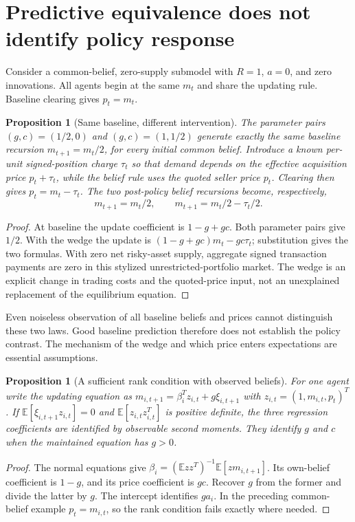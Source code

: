 \documentclass[11pt,a4paper]{article}
\newtheorem{proposition}[theorem]{Proposition}
\theoremstyle{definition}
\theoremstyle{remark}
\newcommand{\E}{\mathbb{E}}
\begin{document}
\section{Predictive equivalence does not identify policy response}
Consider a common-belief, zero-supply submodel with $R=1$, $a=0$, and zero innovations. All agents begin at the same $m_t$ and share the updating rule. Baseline clearing gives $p_t=m_t$.
\begin{proposition}[Same baseline, different intervention]
The parameter pairs $(g,c)=(1/2,0)$ and $(g,c)=(1,1/2)$ generate exactly the same baseline recursion $m_{t+1}=m_t/2$, for every initial common belief. Introduce a known per-unit signed-position charge $\tau_t$ so that demand depends on the effective acquisition price $p_t+\tau_t$, while the belief rule uses the quoted seller price $p_t$. Clearing then gives $p_t=m_t-\tau_t$. The two post-policy belief recursions become, respectively,
\[
 m_{t+1}=m_t/2,\qquad
 m_{t+1}=m_t/2-\tau_t/2.
\]
\end{proposition}
\begin{proof}
At baseline the update coefficient is $1-g+gc$. Both parameter pairs give $1/2$. With the wedge the update is
$(1-g+gc)m_t-gc\tau_t$; substitution gives the two formulas. With zero net risky-asset supply, aggregate signed transaction payments are zero in this stylized unrestricted-portfolio market. The wedge is an explicit change in trading costs and the quoted-price input, not an unexplained replacement of the equilibrium equation.
\end{proof}
Even noiseless observation of all baseline beliefs and prices cannot distinguish these two laws. Good baseline prediction therefore does not establish the policy contrast. The mechanism of the wedge and which price enters expectations are essential assumptions.
\begin{proposition}[A sufficient rank condition with observed beliefs]
For one agent write the updating equation as $m_{i,t+1}=\beta_i^T z_{i,t}+g\xi_{i,t+1}$ with $z_{i,t}=(1,m_{i,t},p_t)^T$. If $\E[\xi_{i,t+1}z_{i,t}]=0$ and $\E[z_{i,t}z_{i,t}^T]$ is positive definite, the three regression coefficients are identified by observable second moments. They identify $g$ and $c$ when the maintained equation has $g>0$.
\end{proposition}
\begin{proof}
The normal equations give
$\beta_i=(\E zz^T)^{-1}\E[zm_{i,t+1}]$.
Its own-belief coefficient is $1-g$, and its price coefficient is $gc$. Recover $g$ from the former and divide the latter by $g$. The intercept identifies $ga_i$. In the preceding common-belief example $p_t=m_{i,t}$, so the rank condition fails exactly where needed.
\end{proof}
\end{document}
